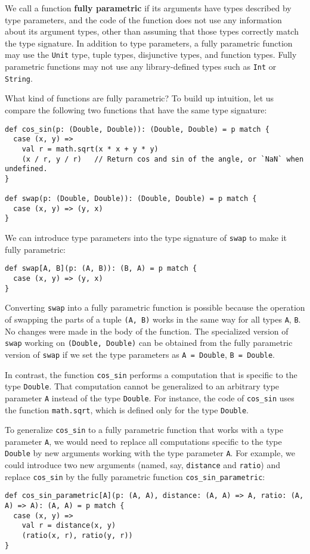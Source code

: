 We call a function \textbf{fully parametric}
if its arguments have types described by type parameters, and the
code of the function does not use any information about its argument
types, other than assuming that those types correctly match the type
signature. In addition to type parameters, a fully parametric function
may use the \lstinline!Unit! type, tuple types, disjunctive types,
and function types. Fully parametric functions may not use any library-defined
types such as \lstinline!Int! or \lstinline!String!.

What kind of functions are fully parametric? To build up intuition,
let us compare the following two functions that have the same type
signature:
\begin{lstlisting}
def cos_sin(p: (Double, Double)): (Double, Double) = p match {
  case (x, y) =>
    val r = math.sqrt(x * x + y * y)
    (x / r, y / r)   // Return cos and sin of the angle, or `NaN` when undefined.
}

def swap(p: (Double, Double)): (Double, Double) = p match {
  case (x, y) => (y, x)
}
\end{lstlisting}
We can introduce type parameters into the type signature of \lstinline!swap!
to make it fully parametric:
\begin{lstlisting}
def swap[A, B](p: (A, B)): (B, A) = p match {
  case (x, y) => (y, x)
}
\end{lstlisting}
Converting \lstinline!swap! into a fully parametric function is possible
because the operation of swapping the parts of a tuple \lstinline!(A, B)!
works in the same way for all types \lstinline!A!, \lstinline!B!.
No changes were made in the body of the function. The specialized
version of \lstinline!swap! working on \lstinline!(Double, Double)!
can be obtained from the fully parametric version of \lstinline!swap!
if we set the type parameters as \lstinline!A = Double!, \lstinline!B = Double!.

In contrast, the function \lstinline!cos_sin! performs a computation
that is specific to the type \lstinline!Double!. That computation
cannot be generalized to an arbitrary type parameter \lstinline!A!
instead of the type \lstinline!Double!. For instance, the code of
\lstinline!cos_sin! uses the function \lstinline!math.sqrt!, which
is defined only for the type \lstinline!Double!. 

To generalize \lstinline!cos_sin! to a fully parametric function
that works with a type parameter \lstinline!A!, we would need to
replace all computations specific to the type \lstinline!Double!
by new arguments working with the type parameter \lstinline!A!. For
example, we could introduce two new arguments (named, say, \lstinline!distance!
and \lstinline!ratio!) and replace \lstinline!cos_sin! by the fully
parametric function \lstinline!cos_sin_parametric!:
\begin{lstlisting}
def cos_sin_parametric[A](p: (A, A), distance: (A, A) => A, ratio: (A, A) => A): (A, A) = p match {
  case (x, y) =>
    val r = distance(x, y)
    (ratio(x, r), ratio(y, r))
}
\end{lstlisting}

